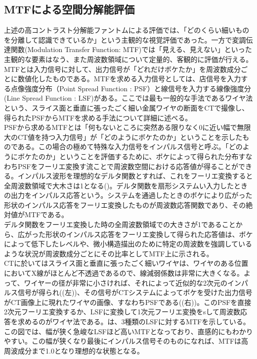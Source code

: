 \subsection{MTFによる空間分解能評価}
上述の高コントラスト分解能ファントムによる評価では、「どのくらい細いものを分離して認識できているか」という主観的な視覚評価であった。一方で変調伝達関数(Modulation Transfer Function: MTF)では「見える、見えない」といった主観的な要素はなう、また周波数領域について定量的、客観的に評価が行える。MTFとは入力信号に対して、出力信号が「どれだけボケたか」を周波数成分ごとに数値化したものである。MTFを求める入力信号としては、店信号を入力する点像強度分布（Point Spread Function : PSF）と線信号を入力する線像強度分(Line Spread Function : LSF)がある。ここでは最も一般的な手法であるワイヤ法という、スライス面と垂直に張ったごく細い金属ワイヤの断面をCTで撮像し、得られたPSFからMTFを求める手法について詳細に述べる。\\
PSFから求めるMTFとは「何もないところに突然ある限りなく0に近い幅で無限大のCT値を持つ入力信号」が「どのようにボケたのか」ということを示したものである。この場合の極めて特殊な入力信号をインパルス信号と呼ぶ。「どのようにボケたのか」ということを評価するために、ボケによって得られた分布すなわちPSFをフーリエ変換す流ことで周波数空間における応答値が得ることができる。インパルス波形を理想的なデルタ関数とすれば、これをフーリエ変換すると全周波数領域で大木さは1となる()。デルタ関数を扇形システムい入力したときの出力をインパルス応答という。システムを通過したときのボケにより広がった形状のインパルス応答をフーリエ変換したものが周波数応答関数であり、その絶対値がMTFである。\\
デルタ関数をフーリエ変換した時の全周波数領域での大きさが1であることから、広がった形状のインパルス応答をフーリエ変換して得られた応答値は、ボケによって低下したレベルや、微小構造描出のために特定の周波数を強調しているような状況が周波数成分ごとにその比率としてMTF上に示される。\\
CTに於いてはスライス面と垂直に張ったごく細いワイヤは、ワイヤのある位置においてX線がほとんど不透過であるので、線減弱係数は非常に大きくなる。よって、ワイヤーの径が非常に小さければ、それによって近似的な2次元のインパルス信号が得られ((左))、その信号がCTシステムによってボケを受けた出力信号がCT画像上に現れたワイヤの画像、すなわちPSFである((右))。このPSFを直接2次元フーリエ変換するか、LSFに変換して1次元フーリエ変換をsして周波数応答を求めるのがワイヤ法である。は、3種類のLSFに対するMTFを示している。この図では、幅が狭く急峻なLSFほど高いMTFとなっており、直感的にもわかりやすい。この幅が狭くなり最後にインパルス信号そのものになれば、MTFは高周波成分まで1.0となり理想的な状態となる。



